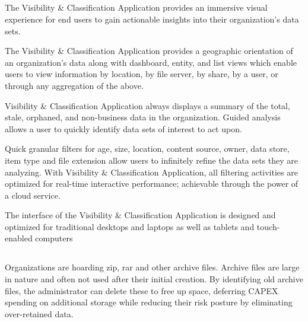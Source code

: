 \documentclass[letterpaper,10pt,english]{sphinxhowto}
\begin{document}
\subsection{}
\label{\detokenize{col/ds/mcdmp_ds_opt3:visualize-information}}
The Visibility \& Classification Application provides an immersive visual experience for end users to gain actionable insights into their organization’s data sets.

 The Visibility \& Classification Application provides a geographic orientation of an organization’s data along with dashboard, entity, and list views which enable users to view information by location, by file server, by share, by a user, or through any aggregation of the above.

 Visibility \& Classification Application always displays a summary of the total, stale, orphaned, and non-business data in the organization. Guided analysis allows a user to quickly identify data sets of interest to act upon.

 Quick granular filters for age, size, location, content source, owner, data store, item type and file extension allow users to infinitely refine the data sets they are analyzing. With Visibility \& Classification Application, all filtering activities are optimized for real-time interactive performance; achievable through the power of a cloud service.

 The interface of the Visibility \& Classification Application is designed and optimized for traditional desktops and laptops as well as tablets and touch-enabled computers


\subsection{}
\label{\detokenize{col/ds/mcdmp_ds_opt3:cost-reduction-risk-reduction-and-operational-efficiency-use-cases}}
 Organizations are hoarding zip, rar and other archive files. Archive files are large in nature and often not used after their initial creation. By identifying old archive files, the administrator can delete these to free up space, deferring CAPEX spending on additional storage while reducing their risk posture by eliminating over-retained data.
\end{document}
